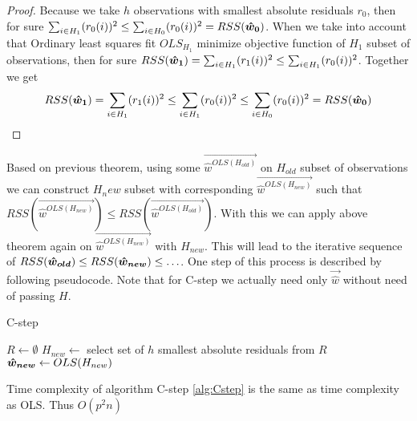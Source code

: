 \begin{proof}
	Because we take $h$ observations with smallest absolute residuals $r_0$, then for sure $\sum_{i\in H_1} (r_0(i))^2 \leq \sum_{i\in H_0} (r_0(i))^2 =  RSS(\boldsymbol{\hat{w}_0})$.
	When we take into account that Ordinary least squares fit $OLS_{H_1}$ minimize objective function of 
	$H_1$ subset of observations, then for sure  $RSS(\boldsymbol{\hat{w}_1}) =  \sum_{i\in H_1} (r_1(i))^2 \leq \sum_{i\in H_1} (r_0(i))^2$.
	Together we get $$RSS(\boldsymbol{\hat{w}_1})=\sum_{i\in H_1}(r_1(i))^2\leq\sum_{i\in H_1}(r_0(i))^2\leq\sum_{i\in H_0}(r_0(i))^2=RSS(\boldsymbol{\hat{w}_0})$$
\end{proof}


\begin{corollary} 
	Based on previous theorem, using some $\vec{\hat{w}^{OLS(H_{old})}}$  on $H_{old}$ subset of observations we can
	construct $H_new$ subset with corresponding $\vec{\hat{w}^{OLS(H_{new})}}$ such that $RSS(\vec{\hat{w}^{OLS(H_{new})}}) \leq RSS(\vec{\hat{w}^{OLS(H_{old})}})$. 
	With this we can apply above theorem again on $\vec{\hat{w}^{OLS(H_{new})}}$ with $H_{new}$. This will lead to the iterative sequence of
	$RSS(\boldsymbol{\hat{w}_{old}}) \leq RSS(\boldsymbol{\hat{w}_{new}}) \leq \ldots$. One step of this process is described by following pseudocode. Note that for C-step we actually need only $\vec{\hat{w}}$ 
	 without need of passing  $H$.
\end{corollary}

\begin{algorithm}[H]
	\label{alg:Cstep}
	\caption{C-step}
	
	$R \gets \emptyset$\;
	$H_{new} \gets $ select set of $h$ smallest absolute residuals from $R$\;
	$\boldsymbol{\hat{w}_{new}} \gets OLS(H_{new})$\;
	\;
\end{algorithm}

\begin{observation} 
	Time complexity of algorithm C-step \ref{alg:Cstep} is the same as time complexity as OLS. Thus $O(p^2n)$
\end{observation} 


